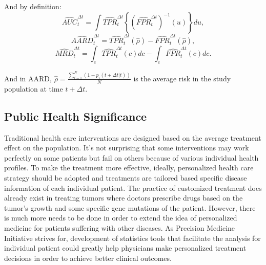 And by definition:
\begin{equation*}\label{bak_est_pAUC}
\widehat{AUC}_t^{\Delta t} = \int \widehat{TPR}_t^{\Delta t}\left\{ (\widehat{FPR}_t^{\Delta t})^{-1}(u)\right\}du,
\end{equation*}
\begin{equation*}\label{bak_est_pAARD}
\widehat{AARD}_t^{\Delta t} = \widehat{TPR}_t^{\Delta t}(\hat{\rho}) - \widehat{FPR}_t^{\Delta t}(\hat{\rho}),
\end{equation*}
\begin{equation*}\label{bak_est_pMRD}
\widehat{MRD}_t^{\Delta t} = \int_c \widehat{TPR}_t^{\Delta t}(c)dc - \int_c \widehat{FPR}_t^{\Delta t}(c)dc.
\end{equation*}

And in AARD, $\hat{\rho} = \frac{\sum_{i=1}^N (1-\hat{p}_i(t+\Delta t| t))}{N}$ is the average risk in the study population at time $t+\Delta t$.




\subsection{Public Health Significance}\label{sec:bak_significance}
Traditional health care interventions are designed based on the average treatment effect on the population. It's not surprising that some interventions may work perfectly on some patients but fail on others because of various individual health profiles. To make the treatment more effective, ideally, personalized health care strategy should be adopted and treatments are tailored based specific disease information of each individual patient. The practice of customized treatment does already exist in treating tumors where doctors prescribe drugs based on the tumor's growth and some specific gene mutations of the patient. However, there is much more needs to be done in order to extend the idea of personalized medicine for patients suffering with other diseases. As Precision Medicine Initiative \citep{collins2015new} strives for, development of statistics tools that facilitate the analysis for individual patient could greatly help physicians make personalized treatment decisions in order to achieve better clinical outcomes.

